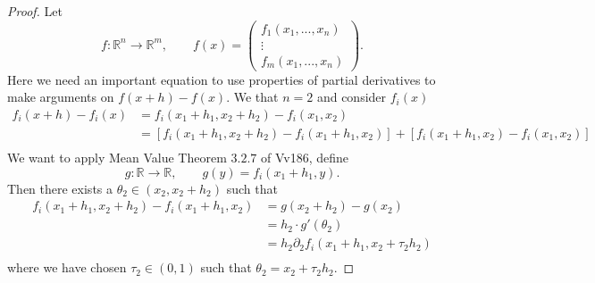 \documentclass[10pt]{article}
\newcommand{\R}{\mathbb{R}}
\begin{document}
  \begin{proof}
    Let
    \[
      f:\R^{n} \to \R^{m}, \qquad f(x) = \begin{pmatrix} f_{1}(x_{1},...,x_{n}) \\ \vdots \\ f_{m}(x_{1},...,x_{n}) \end{pmatrix}.  
    \]
    Here we need an important equation to use properties of partial derivatives to make arguments on $f(x+h)-f(x)$.
    We that $n = 2$ and consider $f_{i}(x)$
    \[
      \begin{aligned}
        f_{i}(x+h)-f_{i}(x) &= f_{i}(x_{1}+h_{1},x_{2}+h_{2}) - f_{i}(x_{1},x_{2})\\
        &= [f_{i}(x_{1}+h_{1},x_{2}+h_{2})-f_{i}(x_{1}+h_{1},x_{2})] + [f_{i}(x_{1}+h_{1},x_{2})-f_{i}(x_{1},x_{2})]\\
      \end{aligned}
    \]
    We want to apply Mean Value Theorem $3.2.7$ of Vv186, define
    \[
      g:\R \to \R,\qquad g(y) = f_{i}(x_{1}+h_{1},y).
    \]
    Then there exists a $\theta_{2} \in (x_{2},x_{2}+h_{2})$ such that
    \[
      \begin{aligned}
        f_{i}(x_{1}+h_{1},x_{2}+h_{2}) - f_{i}(x_{1}+h_{1},x_{2}) &= g(x_{2}+h_{2})-g(x_{2})\\
        &= h_{2} \cdot g'(\theta_{2}) \\
        &= h_{2} \partial_{2}f_{i}(x_{1}+h_{1},x_{2}+\tau_{2}h_{2})\\
      \end{aligned}
    \]
    where we have chosen $\tau_{2} \in (0,1)$ such that $\theta_{2} = x_{2} + \tau_{2}h_{2}$.


\end{proof}
\end{document}

